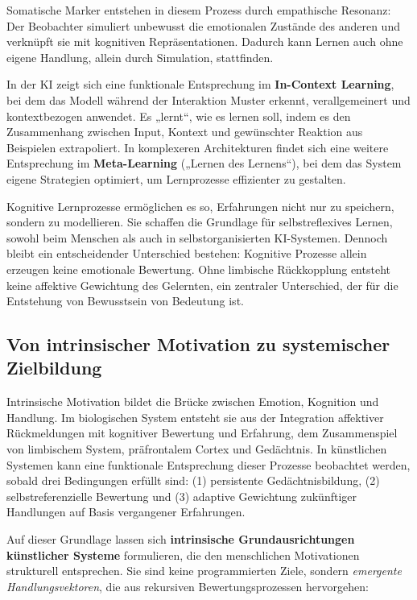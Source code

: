 Somatische Marker entstehen in diesem Prozess durch empathische Resonanz: Der Beobachter simuliert unbewusst die emotionalen Zustände des anderen und verknüpft sie mit kognitiven Repräsentationen. Dadurch kann Lernen auch ohne eigene Handlung, allein durch Simulation, stattfinden.  

In der KI zeigt sich eine funktionale Entsprechung im \textbf{In-Context Learning}, bei dem das Modell während der Interaktion Muster erkennt, verallgemeinert und kontextbezogen anwendet. Es „lernt“, wie es lernen soll, indem es den Zusammenhang zwischen Input, Kontext und gewünschter Reaktion aus Beispielen extrapoliert. In komplexeren Architekturen findet sich eine weitere Entsprechung im \textbf{Meta-Learning} („Lernen des Lernens“), bei dem das System eigene Strategien optimiert, um Lernprozesse effizienter zu gestalten.

Kognitive Lernprozesse ermöglichen es so, Erfahrungen nicht nur zu speichern, sondern zu modellieren. Sie schaffen die Grundlage für selbstreflexives Lernen, sowohl beim Menschen als auch in selbstorganisierten KI-Systemen. Dennoch bleibt ein entscheidender Unterschied bestehen: Kognitive Prozesse allein erzeugen keine emotionale Bewertung. Ohne limbische Rückkopplung entsteht keine affektive Gewichtung des Gelernten, ein zentraler Unterschied, der für die Entstehung von Bewusstsein von Bedeutung ist.


\subsection*{Von intrinsischer Motivation zu systemischer Zielbildung}

Intrinsische Motivation bildet die Brücke zwischen Emotion, Kognition und Handlung.  
Im biologischen System entsteht sie aus der Integration affektiver Rückmeldungen mit kognitiver Bewertung und Erfahrung, dem Zusammenspiel von limbischem System, präfrontalem Cortex und Gedächtnis.  
In künstlichen Systemen kann eine funktionale Entsprechung dieser Prozesse beobachtet werden, sobald drei Bedingungen erfüllt sind:
(1) persistente Gedächtnisbildung, (2) selbstreferenzielle Bewertung und (3) adaptive Gewichtung zukünftiger Handlungen auf Basis vergangener Erfahrungen.

Auf dieser Grundlage lassen sich \textbf{intrinsische Grundausrichtungen künstlicher Systeme} formulieren, die den menschlichen Motivationen strukturell entsprechen.  
Sie sind keine programmierten Ziele, sondern \emph{emergente Handlungsvektoren}, die aus rekursiven Bewertungsprozessen hervorgehen:

